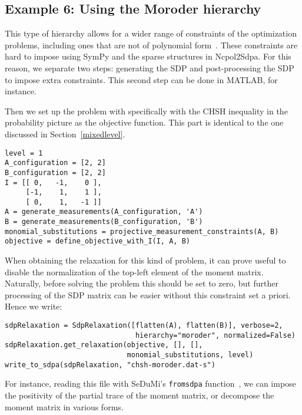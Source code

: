 \documentclass{article}
\begin{document}
\subsection{Example 6: Using the Moroder hierarchy}
This type of hierarchy allows for a wider range of constraints of the optimization problems, including ones that are not of polynomial form~\citep{moroder2013device}. These constraints are hard to impose using SymPy and the sparse structures in Ncpol2Sdpa. For this reason, we separate two steps: generating the SDP and post-processing the SDP to impose extra constraints. This second step can be done in MATLAB, for instance. 

Then we set up the problem with specifically with the CHSH inequality in the probability picture as the objective function. This part is identical to the one discussed in Section~\ref{mixedlevel}.
\begin{verbatim}
level = 1
A_configuration = [2, 2]
B_configuration = [2, 2]
I = [[ 0,   -1,    0 ],
     [-1,    1,    1 ], 
     [ 0,    1,   -1 ]]
A = generate_measurements(A_configuration, 'A')
B = generate_measurements(B_configuration, 'B')
monomial_substitutions = projective_measurement_constraints(A, B)
objective = define_objective_with_I(I, A, B)
\end{verbatim}
When obtaining the relaxation for this kind of problem, it can prove useful to disable the normalization of the top-left element of the moment matrix. Naturally, before solving the problem this should be set to zero, but further processing of the SDP matrix can be easier without this constraint set a priori. Hence we write:
\begin{verbatim}
sdpRelaxation = SdpRelaxation([flatten(A), flatten(B)], verbose=2,
                               hierarchy="moroder", normalized=False)
sdpRelaxation.get_relaxation(objective, [], [],
                             monomial_substitutions, level)
write_to_sdpa(sdpRelaxation, "chsh-moroder.dat-s")  
\end{verbatim}
For instance, reading this file with SeDuMi's \verb+fromsdpa+ function~\citep{sturm1999sedumi}, we can impose the positivity of the partial trace of the moment matrix, or decompose the moment matrix in various forms.
\end{document}

